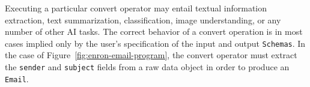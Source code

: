 



Executing a particular convert operator may entail textual information extraction, text summarization, classification, image understanding, or any number of other AI tasks. The correct behavior of a convert operation is in most cases implied only by the user's specification of the input and output {\tt Schemas}. In the case of Figure~\ref{fig:enron-email-program}, the convert operator must extract the {\tt sender} and {\tt subject} fields from a raw data object in order to produce an {\tt Email}.


